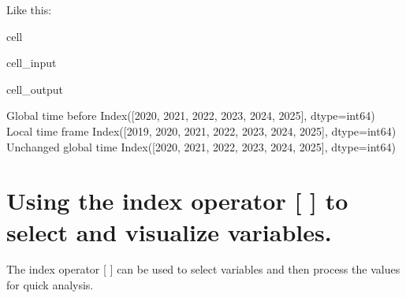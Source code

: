\documentclass[letterpaper,10pt,english]{jupyterBook}
\begin{document}
\sphinxAtStartPar
Like this:

\begin{sphinxuseclass}{cell}\begin{sphinxVerbatimInput}

\begin{sphinxuseclass}{cell_input}
\begin{sphinxVerbatim}[commandchars=\\\{\}]
  
\end{sphinxVerbatim}

\end{sphinxuseclass}\end{sphinxVerbatimInput}
\begin{sphinxVerbatimOutput}

\begin{sphinxuseclass}{cell_output}
\begin{sphinxVerbatim}[commandchars=\\\{\}]
Global time  before   Index([2020, 2021, 2022, 2023, 2024, 2025], dtype=\PYGZsq{}int64\PYGZsq{})
Local time frame      Index([2019, 2020, 2021, 2022, 2023, 2024, 2025], dtype=\PYGZsq{}int64\PYGZsq{})
Unchanged global time Index([2020, 2021, 2022, 2023, 2024, 2025], dtype=\PYGZsq{}int64\PYGZsq{})
\end{sphinxVerbatim}

\end{sphinxuseclass}\end{sphinxVerbatimOutput}

\end{sphinxuseclass}

\section{Using the index operator {[} {]} to select and visualize variables.}
\label{\detokenize{content/notebooks/modelflow_features:using-the-index-operator-to-select-and-visualize-variables}}\label{\detokenize{content/notebooks/modelflow_features:index-operator}}
\sphinxAtStartPar
The index operator {[} {]} can be used to select variables and then process the values for quick analysis.
\end{document}

